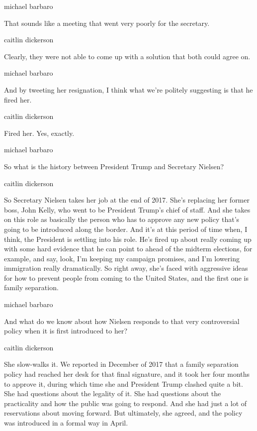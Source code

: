michael barbaro

That sounds like a meeting that went very poorly for the secretary.

caitlin dickerson

Clearly, they were not able to come up with a solution that both could
agree on.

michael barbaro

And by tweeting her resignation, I think what we're politely suggesting
is that he fired her.

caitlin dickerson

Fired her. Yes, exactly.

michael barbaro

So what is the history between President Trump and Secretary Nielsen?

caitlin dickerson

So Secretary Nielsen takes her job at the end of 2017. She's replacing
her former boss, John Kelly, who went to be President Trump's chief of
staff. And she takes on this role as basically the person who has to
approve any new policy that's going to be introduced along the border.
And it's at this period of time when, I think, the President is settling
into his role. He's fired up about really coming up with some hard
evidence that he can point to ahead of the midterm elections, for
example, and say, look, I'm keeping my campaign promises, and I'm
lowering immigration really dramatically. So right away, she's faced
with aggressive ideas for how to prevent people from coming to the
United States, and the first one is family separation.

michael barbaro

And what do we know about how Nielsen responds to that very
controversial policy when it is first introduced to her?

caitlin dickerson

She slow-walks it. We reported in December of 2017 that a family
separation policy had reached her desk for that final signature, and it
took her four months to approve it, during which time she and President
Trump clashed quite a bit. She had questions about the legality of it.
She had questions about the practicality and how the public was going to
respond. And she had just a lot of reservations about moving forward.
But ultimately, she agreed, and the policy was introduced in a formal
way in April.

